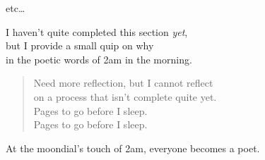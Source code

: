 etc\dots



\begin{draftvspace}{1in}
  I haven't quite completed this section \emph{yet}, \\
    but I provide a small quip on why \\
    in the poetic words of 2am in the morning.
  \begin{verse}
    Need more reflection, but I cannot reflect \\
    on a process that isn't complete quite yet. \\
    Pages to go before I sleep. \\
    Pages to go before I sleep. \\
  \end{verse}

  \begin{displayquote}[Plato]
    At the moondial's touch of 2am, everyone becomes a poet.
  \end{displayquote}
\end{draftvspace}


